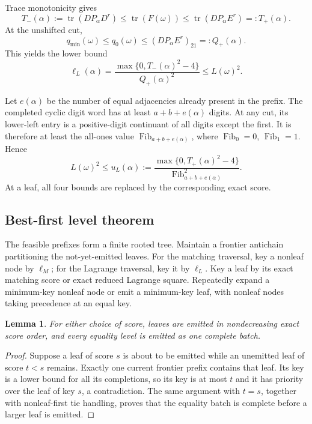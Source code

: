 \documentclass[11pt]{amsart}
\newtheorem{lemma}[theorem]{Lemma}
\theoremstyle{definition}
\newcommand{\tr}{\operatorname{tr}}
\newcommand{\Fib}{\operatorname{Fib}}
\begin{document}
Trace monotonicity gives
\[
 T_-(\alpha):=\tr(DP_\alpha D^r)
 \leq \tr(F(\omega))\leq
 \tr(DP_\alpha E^r)=:T_+(\alpha).
\]
At the unshifted cut,
\[
 q_{\min}(\omega)\leq q_0(\omega)
 \leq (DP_\alpha E^r)_{21}=:Q_+(\alpha).
\]
This yields the lower bound
\begin{equation}\label{eq:L-lower}
 \ell_L(\alpha)=
 \frac{\max\{0,T_-(\alpha)^2-4\}}{Q_+(\alpha)^2}
 \leq L(\omega)^2.
\end{equation}

Let $e(\alpha)$ be the number of equal adjacencies already present in the
prefix.  The completed cyclic digit word has at least $a+b+e(\alpha)$ digits.
At any cut, its lower-left entry is a positive-digit continuant of all digits
except the first.  It is therefore at least the all-ones value
$\Fib_{a+b+e(\alpha)}$, where $\Fib_0=0$, $\Fib_1=1$.  Hence
\begin{equation}\label{eq:L-upper}
 L(\omega)^2\leq
 u_L(\alpha):=
 \frac{\max\{0,T_+(\alpha)^2-4\}}
 {\Fib_{a+b+e(\alpha)}^2}.
\end{equation}
At a leaf, all four bounds are replaced by the corresponding exact score.

\subsection{Best-first level theorem}

The feasible prefixes form a finite rooted tree.  Maintain a frontier
antichain partitioning the not-yet-emitted leaves.  For the matching traversal,
key a nonleaf node by $\ell_M$; for the Lagrange traversal, key it by
$\ell_L$.  Key a leaf by its exact matching score or exact reduced Lagrange
square.  Repeatedly expand a minimum-key nonleaf node or emit a minimum-key
leaf, with nonleaf nodes taking precedence at an equal key.

\begin{lemma}\label{lem:best-first}
For either choice of score, leaves are emitted in nondecreasing exact score
order, and every equality level is emitted as one complete batch.
\end{lemma}

\begin{proof}
Suppose a leaf of score $s$ is about to be emitted while an unemitted leaf of
score $t<s$ remains.  Exactly one current frontier prefix contains that leaf.
Its key is a lower bound for all its completions, so its key is at most $t$ and
it has priority over the leaf of key $s$, a contradiction.  The same argument
with $t=s$, together with nonleaf-first tie handling, proves that the equality
batch is complete before a larger leaf is emitted.
\end{proof}
\end{document}
